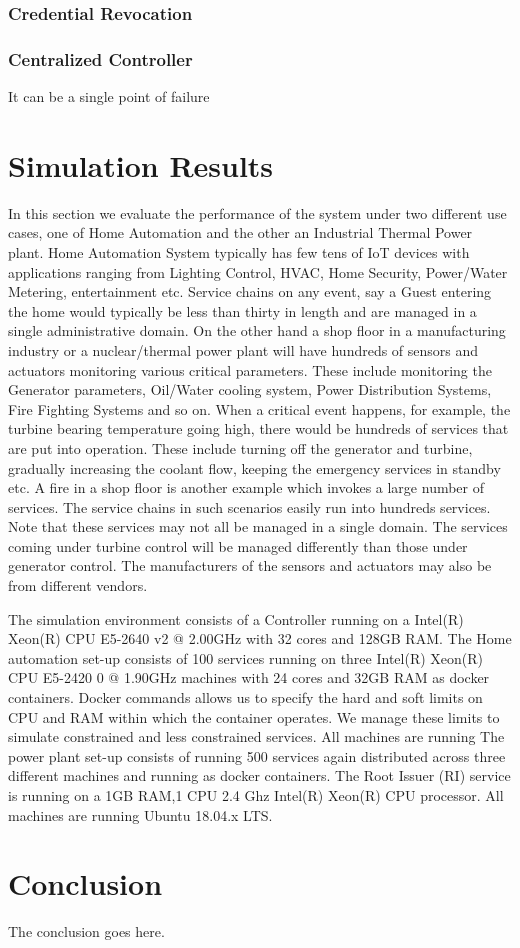 \documentclass[journal]{IEEEtran}
\begin{document}
\subsubsection{Credential Revocation}

\subsubsection{Centralized Controller}
It can be a single point of failure

\section{Simulation Results} \label{implementation}
In this section we evaluate the performance of the system under two different use cases, one of Home Automation and the other an Industrial Thermal Power plant. Home Automation System typically has few tens of IoT devices with applications ranging from Lighting Control, HVAC, Home Security, Power/Water Metering, entertainment etc. Service chains on any event, say a Guest entering the home would typically be less than thirty in length and are managed in a single administrative domain. On the other hand a shop floor in a manufacturing industry or a nuclear/thermal power plant will have hundreds of sensors and actuators monitoring various critical parameters. These include monitoring the Generator parameters, Oil/Water cooling system, Power Distribution Systems, Fire Fighting Systems and so on. When a critical event happens, for example, the turbine bearing temperature going high, there would be hundreds of services that are put into operation. These include turning off the generator and turbine,  gradually increasing the coolant flow, keeping the emergency services in standby etc. A fire in a shop floor is another example which invokes a large number of services. The service chains in such scenarios easily run into hundreds services. Note that these services may not all be managed in a single domain. The services coming under turbine control will be managed differently than those under generator control. The manufacturers of the sensors and actuators may also be from different vendors.

The simulation environment consists of a Controller running on a Intel(R) Xeon(R) CPU E5-2640 v2 @ 2.00GHz with 32 cores and 128GB RAM. The Home automation set-up consists of 100 services running on three Intel(R) Xeon(R) CPU E5-2420 0 @ 1.90GHz machines with 24 cores and 32GB RAM as docker containers. Docker commands allows us to specify the hard and soft limits on CPU and RAM within which the container operates. We manage these limits to simulate constrained and less constrained services. All machines are running The power plant set-up consists of running 500 services again distributed across three different machines and running as docker containers. The Root Issuer (RI) service is running on a 1GB RAM,1 CPU 2.4 Ghz Intel(R) Xeon(R) CPU processor.  All machines are running Ubuntu 18.04.x LTS.




\section{Conclusion}
The conclusion goes here.



\end{document}
